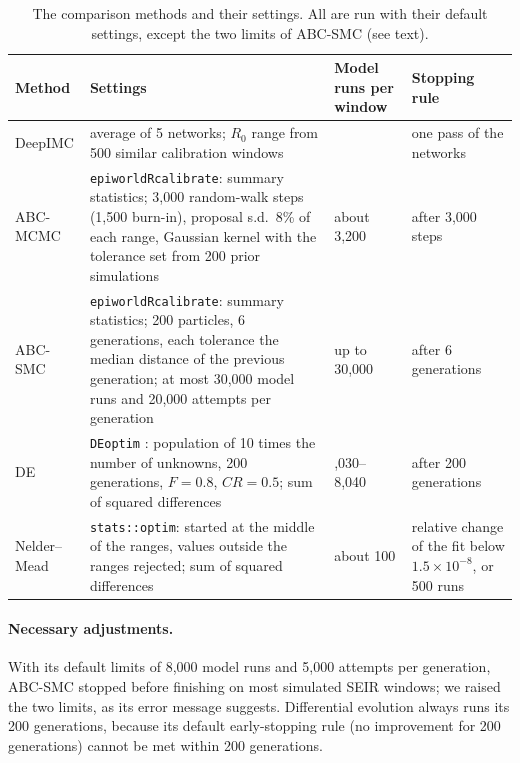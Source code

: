 \documentclass[12pt]{article}
\begin{document}
\begin{table}[htbp]
\centering
\caption{The comparison methods and their settings. All are run with their default settings, except
the two limits of ABC-SMC (see text).}
\label{tab:baselines}
\small
\begin{tabular}{>{\raggedright\arraybackslash}p{2.3cm} >{\raggedright\arraybackslash}p{7.0cm} >{\raggedleft\arraybackslash}p{1.9cm} >{\raggedright\arraybackslash}p{3.1cm}}
\toprule
Method & Settings & Model runs per window & Stopping rule \\
\midrule
DeepIMC & average of 5 networks; $R_0$ range from 500 similar calibration windows & 0 & one pass of the networks \\
ABC-MCMC \autocite{marjoramMarkovChainMonte2003} & \texttt{epiworldRcalibrate}: summary statistics; 3,000 random-walk steps (1,500 burn-in), proposal s.d.\ 8\% of each range, Gaussian kernel with the tolerance set from 200 prior simulations & about 3,200 & after 3,000 steps \\
ABC-SMC \autocite{toniApproximateBayesianComputation2008} & \texttt{epiworldRcalibrate}: summary statistics; 200 particles, 6 generations, each tolerance the median distance of the previous generation; at most 30,000 model runs and 20,000 attempts per generation & up to 30,000 & after 6 generations \\
DE \autocite{storn1997differential} & \texttt{DEoptim} \autocite{mullen2011deoptim}: population of 10 times the number of unknowns, 200 generations, $F = 0.8$, $CR = 0.5$; sum of squared differences & 6,030--8,040 & after 200 generations \\
Nelder--Mead \autocite{nelder1965simplex} & \texttt{stats::optim}: started at the middle of the ranges, values outside the ranges rejected; sum of squared differences & about 100 & relative change of the fit below $1.5\times10^{-8}$, or 500 runs \\
\bottomrule
\end{tabular}
\end{table}

\paragraph{Necessary adjustments.} With its default limits of 8,000 model runs and 5,000 attempts per
generation, ABC-SMC stopped before finishing on most simulated SEIR windows; we raised the two limits,
as its error message suggests. Differential evolution always runs its 200 generations, because its
default early-stopping rule (no improvement for 200 generations) cannot be met within 200 generations.
\end{document}
